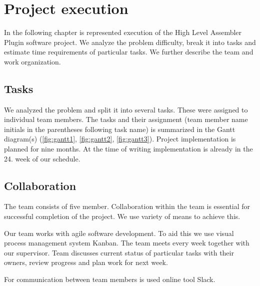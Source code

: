 \chapter{Project execution}

In the following chapter is represented execution of the High Level Assembler Plugin software project. 
We analyze the problem difficulty, break it into tasks and estimate time requirements of particular tasks.
We further describe the team and work organization.

\section{Tasks}
We analyzed the problem and split it into several tasks. These were assigned to individual team members. The tasks and their assignment (team member name initials in the parentheses following task name) is summarized in the Gantt diagram(s)  (\ref{fig:gantt1}, \ref{fig:gantt2}, \ref{fig:gantt3}). 
Project implementation is planned for nine months. At the time of writing implementation is already in the 24. week of our schedule.	

\section{Collaboration}
The team consists of five member. Collaboration within the team is essential for successful completion of the project. We use variety of means to achieve this. 

Our team works with agile software development. To aid this we use visual process management system Kanban. The team meets every week together with our supervisor. Team discusses current status of particular tasks with their owners, review progress and plan work for next week.

For communication between team members is used online tool Slack.


